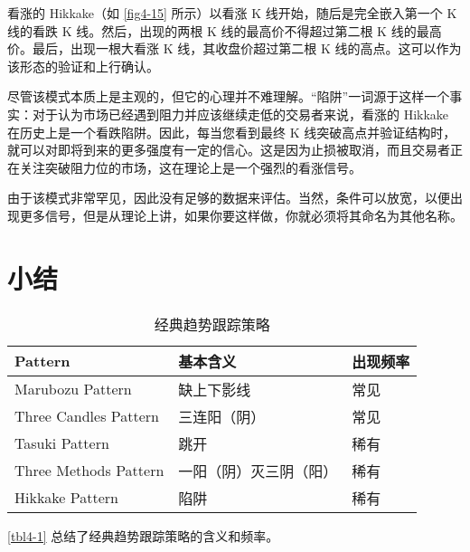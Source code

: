 看涨的 Hikkake（如 \autoref{fig4-15} 所示）以看涨 K 线开始，随后是完全嵌入第一个 K 线的看跌 K 线。然后，出现的两根 K 线的最高价不得超过第二根 K 线的最高价。最后，出现一根大看涨 K 线，其收盘价超过第二根 K 线的高点。这可以作为该形态的验证和上行确认。

尽管该模式本质上是主观的，但它的心理并不难理解。“陷阱”一词源于这样一个事实：对于认为市场已经遇到阻力并应该继续走低的交易者来说，看涨的 Hikkake 在历史上是一个看跌陷阱。因此，每当您看到最终 K 线突破高点并验证结构时，就可以对即将到来的更多强度有一定的信心。这是因为止损被取消，而且交易者正在关注突破阻力位的市场，这在理论上是一个强烈的看涨信号。

由于该模式非常罕见，因此没有足够的数据来评估。当然，条件可以放宽，以便出现更多信号，但是从理论上讲，如果你要这样做，你就必须将其命名为其他名称。
\section{小结}
\begin{table}
    \centering
    \caption{经典趋势跟踪策略}
    \label{tbl4-1}
    \begin{tabular}{lll}
        \hline
        Pattern               & 基本含义        & 出现频率 \\
        \hline
        Marubozu Pattern      & 缺上下影线       & 常见   \\
        Three Candles Pattern & 三连阳（阴）      & 常见   \\
        Tasuki Pattern        & 跳开          & 稀有   \\
        Three Methods Pattern & 一阳（阴）灭三阴（阳） & 稀有   \\
        Hikkake Pattern       & 陷阱          & 稀有   \\
        \hline
    \end{tabular}
\end{table}
\autoref{tbl4-1} 总结了经典趋势跟踪策略的含义和频率。